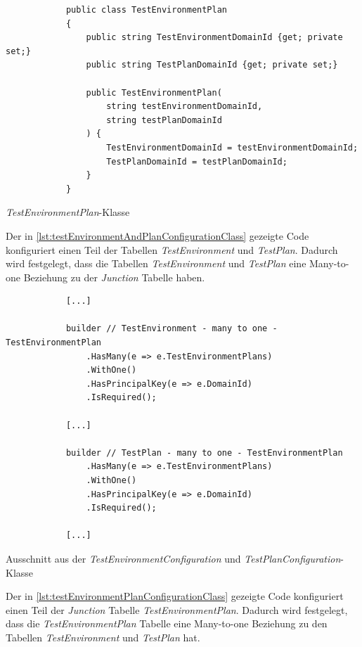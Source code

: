 \documentclass[a4paper, fontsize=11pt, parskip=half, twoside]{scrreprt}
\begin{document}
	\begin{listing}[ht]
		\begin{verbatim}
			public class TestEnvironmentPlan
			{
				public string TestEnvironmentDomainId {get; private set;}
				public string TestPlanDomainId {get; private set;}
				
				public TestEnvironmentPlan(
					string testEnvironmentDomainId, 
					string testPlanDomainId
				) {
					TestEnvironmentDomainId = testEnvironmentDomainId;
					TestPlanDomainId = testPlanDomainId;
				}
			}
		\end{verbatim}
		\caption{\emph{TestEnvironmentPlan}-Klasse}
		\label{lst:testEnvironmentPlanClass}
	\end{listing}
	
	Der in \autoref{lst:testEnvironmentAndPlanConfigurationClass} gezeigte Code konfiguriert einen Teil der Tabellen \emph{TestEnvironment} und \emph{TestPlan}.
	Dadurch wird festgelegt, dass die Tabellen \emph{TestEnvironment} und \emph{TestPlan} eine Many-to-one Beziehung zu der \emph{Junction} Tabelle haben.
	
	\begin{listing}[ht]
		\begin{verbatim}
			[...]	
			
			builder // TestEnvironment - many to one - TestEnvironmentPlan
				.HasMany(e => e.TestEnvironmentPlans)
				.WithOne()
				.HasPrincipalKey(e => e.DomainId)
				.IsRequired();
				
			[...]	
			
			builder // TestPlan - many to one - TestEnvironmentPlan
				.HasMany(e => e.TestEnvironmentPlans)
				.WithOne()
				.HasPrincipalKey(e => e.DomainId)
				.IsRequired();							
				
			[...]
		\end{verbatim}
		\caption{Ausschnitt aus der \emph{TestEnvironmentConfiguration} und \emph{TestPlanConfiguration}-Klasse}
		\label{lst:testEnvironmentAndPlanConfigurationClass}
	\end{listing}

	Der in \autoref{lst:testEnvironmentPlanConfigurationClass} gezeigte Code konfiguriert einen Teil der \emph{Junction} Tabelle \emph{TestEnvironmentPlan}.
	Dadurch wird festgelegt, dass die \emph{TestEnvironmentPlan} Tabelle eine Many-to-one Beziehung zu den Tabellen \emph{TestEnvironment} und \emph{TestPlan} hat.
\end{document}
